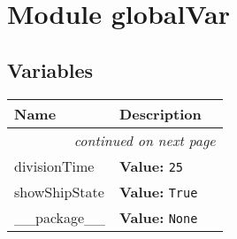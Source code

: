 %
%
%


\section{Module globalVar}

    \label{globalVar}


  \subsection{Variables}

    \vspace{-1cm}
\hspace{\varindent}\begin{longtable}{|p{\varnamewidth}|p{\vardescrwidth}|l}
\cline{1-2}
\cline{1-2} \centering \textbf{Name} & \centering \textbf{Description}& \\
\cline{1-2}
\endhead\cline{1-2}\multicolumn{3}{r}{\small\textit{continued on next page}}\\\endfoot\cline{1-2}
\endlastfoot\raggedright d\-i\-v\-i\-s\-i\-o\-n\-T\-i\-m\-e\- & \raggedright \textbf{Value:} 
{\tt 25}&\\
\cline{1-2}
\raggedright s\-h\-o\-w\-S\-h\-i\-p\-S\-t\-a\-t\-e\- & \raggedright \textbf{Value:} 
{\tt True}&\\
\cline{1-2}
\raggedright \_\-\_\-p\-a\-c\-k\-a\-g\-e\-\_\-\_\- & \raggedright \textbf{Value:} 
{\tt None}&\\
\cline{1-2}
\end{longtable}

